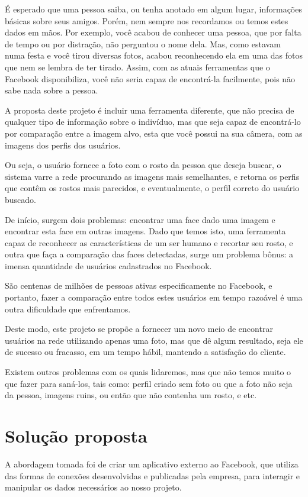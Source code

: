 \documentclass[10pt,a4paper]{article}
\begin{document}
	É esperado que uma pessoa saiba, ou tenha anotado em algum lugar, informações básicas sobre seus amigos. Porém, nem sempre nos recordamos ou temos estes dados em mãos. Por exemplo, você acabou de conhecer uma pessoa, que por falta de tempo ou por distração, não perguntou o nome dela. Mas, como estavam numa festa e você tirou diversas fotos, acabou reconhecendo ela em uma das fotos que nem se lembra de ter tirado. Assim, com as atuais ferramentas que o Facebook disponibiliza, você não seria capaz de encontrá-la facilmente, pois não sabe nada sobre a pessoa.

A proposta deste projeto é incluir uma ferramenta diferente, que não precisa de qualquer tipo de informação sobre o indivíduo, mas que seja capaz de encontrá-lo por comparação entre a imagem alvo, esta que você possui na sua câmera, com as imagens dos perfis dos usuários.

	Ou seja, o usuário fornece a foto com o rosto da pessoa que deseja buscar, o sistema varre a rede procurando as imagens mais semelhantes, e retorna os perfis que contêm os rostos mais parecidos, e eventualmente, o perfil correto do usuário buscado.

	De início, surgem dois problemas: encontrar uma face dado uma imagem e encontrar esta face em outras imagens. Dado que temos isto, uma ferramenta capaz de reconhecer as características de um ser humano e recortar seu rosto, e outra que faça a comparação das faces detectadas, surge um problema bônus: a imensa quantidade de usuários cadastrados no Facebook.

	São centenas de milhões de pessoas ativas especificamente no Facebook, e portanto, fazer a comparação entre todos estes usuários em tempo razoável é uma outra dificuldade que enfrentamos.

	Deste modo, este projeto se propõe a fornecer um novo meio de encontrar usuários na rede utilizando apenas uma foto, mas que dê algum resultado, seja ele de sucesso ou fracasso, em um tempo hábil, mantendo a satisfação do cliente.

	Existem outros problemas com os quais lidaremos, mas que não
        temos muito o que fazer para saná-los, tais como: perfil
        criado sem foto ou que a foto não seja da pessoa, imagens
        ruins, ou então que não contenha um rosto, e etc.

\section{Solução proposta}
A abordagem tomada foi de criar um aplicativo externo ao Facebook, que utiliza das formas de conexões desenvolvidas e publicadas pela empresa, para interagir e manipular os dados necessários ao nosso projeto.
\end{document}
